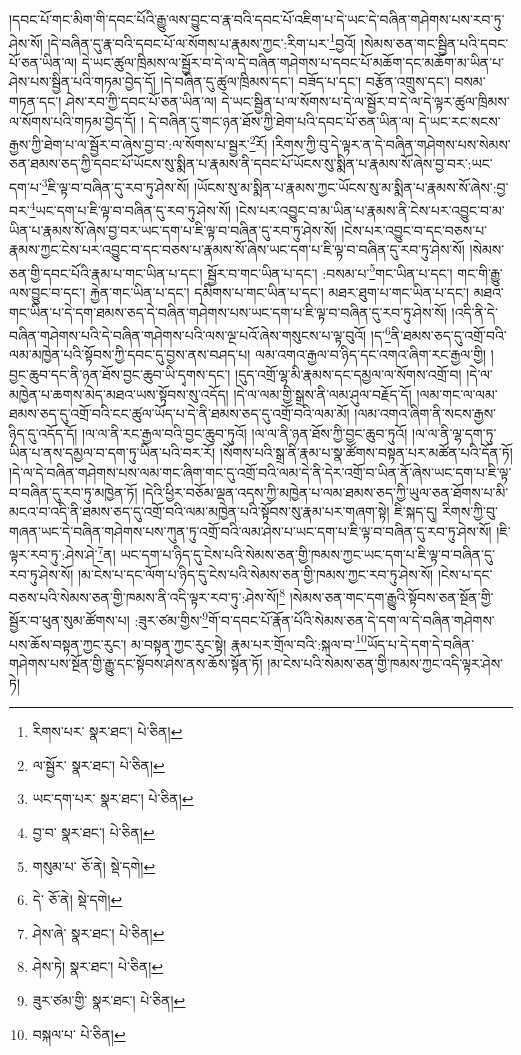 །དབང་པོ་གང་མིག་གི་དབང་པོའི་རྒྱུ་ལས་བྱུང་བ་རྣ་བའི་དབང་པོ་འཇིག་པ་དེ་ཡང་དེ་བཞིན་གཤེགས་པས་རབ་ཏུ་ཤེས་སོ། །དེ་བཞིན་དུ་རྣ་བའི་དབང་པོ་ལ་སོགས་པ་རྣམས་ཀྱང་:རིག་པར་\footnote{རིགས་པར་  སྣར་ཐང་།  པེ་ཅིན། }བྱའོ། །སེམས་ཅན་གང་སྦྱིན་པའི་དབང་པོ་ཅན་ཡིན་ལ། དེ་ཡང་ཚུལ་ཁྲིམས་ལ་སྦྱོར་བ་དེ་ལ་དེ་བཞིན་གཤེགས་པ་དབང་པོ་མཆོག་དང་མཆོག་མ་ཡིན་པ་ཤེས་པས་སྦྱིན་པའི་གཏམ་བྱེད་དོ། །དེ་བཞིན་དུ་ཚུལ་ཁྲིམས་དང་། བཟོད་པ་དང་། བརྩོན་འགྲུས་དང་། བསམ་གཏན་དང་། ཤེས་རབ་ཀྱི་དབང་པོ་ཅན་ཡིན་ལ། དེ་ཡང་སྦྱིན་པ་ལ་སོགས་པ་དེ་ལ་སྦྱོར་བ་དེ་ལ་དེ་ལྟར་ཚུལ་ཁྲིམས་ལ་སོགས་པའི་གཏམ་བྱེད་དོ། །
དེ་བཞིན་དུ་གང་ཉན་ཐོས་ཀྱི་ཐེག་པའི་དབང་པོ་ཅན་ཡིན་ལ། དེ་ཡང་རང་སངས་རྒྱས་ཀྱི་ཐེག་པ་ལ་སྦྱོར་བ་ཞེས་བྱ་བ་:ལ་སོགས་པ་སྦྱར་\footnote{ལ་སྦྱོར་  སྣར་ཐང་།  པེ་ཅིན། }རོ། །རིགས་ཀྱི་བུ་དེ་ལྟར་ན་དེ་བཞིན་གཤེགས་པས་སེམས་ཅན་ཐམས་ཅད་ཀྱི་དབང་པོ་ཡོངས་སུ་སྨིན་པ་རྣམས་ནི་དབང་པོ་ཡོངས་སུ་སྨིན་པ་རྣམས་སོ་ཞེས་བྱ་བར་:ཡང་དག་པ་\footnote{ཡང་དག་པར་  སྣར་ཐང་།  པེ་ཅིན། }ཇི་ལྟ་བ་བཞིན་དུ་རབ་ཏུ་ཤེས་སོ། །ཡོངས་སུ་མ་སྨིན་པ་རྣམས་ཀྱང་ཡོངས་སུ་མ་སྨིན་པ་རྣམས་སོ་ཞེས་:བྱ་བར་\footnote{བྱ་བ་  སྣར་ཐང་།  པེ་ཅིན། }ཡང་དག་པ་ཇི་ལྟ་བ་བཞིན་དུ་རབ་ཏུ་ཤེས་སོ། །ངེས་པར་འབྱུང་བ་མ་ཡིན་པ་རྣམས་ནི་ངེས་པར་འབྱུང་བ་མ་ཡིན་པ་རྣམས་སོ་ཞེས་བྱ་བར་ཡང་དག་པ་ཇི་ལྟ་བ་བཞིན་དུ་རབ་ཏུ་ཤེས་སོ། །ངེས་པར་འབྱུང་བ་དང་བཅས་པ་རྣམས་ཀྱང་ངེས་པར་འབྱུང་བ་དང་བཅས་པ་རྣམས་སོ་ཞེས་ཡང་དག་པ་ཇི་ལྟ་བ་བཞིན་དུ་རབ་ཏུ་ཤེས་སོ། །སེམས་ཅན་གྱི་དབང་པོའི་རྣམ་པ་གང་ཡིན་པ་དང་། སྦྱོར་བ་གང་ཡིན་པ་དང་། :བསམ་པ་\footnote{གསུམ་པ་  ཅོ་ནེ།  སྡེ་དགེ། }གང་ཡིན་པ་དང་། གང་གི་རྒྱུ་ལས་བྱུང་བ་དང་། རྐྱེན་གང་ཡིན་པ་དང་། དམིགས་པ་གང་ཡིན་པ་དང་། མཐར་ཐུག་པ་གང་ཡིན་པ་དང་། མཐའ་གང་ཡིན་པ་དེ་དག་ཐམས་ཅད་དེ་བཞིན་གཤེགས་པས་ཡང་དག་པ་ཇི་ལྟ་བ་བཞིན་དུ་རབ་ཏུ་ཤེས་སོ། །འདི་ནི་དེ་བཞིན་གཤེགས་པའི་དེ་བཞིན་གཤེགས་པའི་ལས་ལྔ་པའོ་ཞེས་གསུངས་པ་ལྟ་བུའོ། །ད་\footnote{དེ་  ཅོ་ནེ།  སྡེ་དགེ། }ནི་ཐམས་ཅད་དུ་འགྲོ་བའི་ལམ་མཁྱེན་པའི་སྟོབས་ཀྱི་དབང་དུ་བྱས་ནས་བཤད་པ། ལམ་འགའ་རྒྱལ་བ་ཉིད་དང་འགའ་ཞིག་རང་རྒྱལ་གྱི། །བྱང་ཆུབ་དང་ནི་ཉན་ཐོས་བྱང་ཆུབ་ཡི་དྭགས་དང་། །དུད་འགྲོ་ལྷ་མི་རྣམས་དང་དམྱལ་ལ་སོགས་འགྲོ་བ། །དེ་ལ་མཁྱེན་པ་ཆགས་མེད་མཐའ་ཡས་སྟོབས་སུ་འདོད། །དེ་ལ་ལམ་གྱི་སྒྲས་ནི་ལམ་ཤུལ་བརྗོད་དོ། །ལམ་གང་ལ་ལམ་ཐམས་ཅད་དུ་འགྲོ་བའི་ངང་ཚུལ་ཡོད་པ་དེ་ནི་ཐམས་ཅད་དུ་འགྲོ་བའི་ལམ་མོ། །ལམ་འགའ་ཞིག་ནི་སངས་རྒྱས་ཉིད་དུ་འདོད་དོ། །ལ་ལ་ནི་རང་རྒྱལ་བའི་བྱང་ཆུབ་ཏུའོ། །ལ་ལ་ནི་ཉན་ཐོས་ཀྱི་བྱང་ཆུབ་ཏུའོ། །ལ་ལ་ནི་ལྷ་དག་ཏུ་ཡིན་པ་ནས་དམྱལ་བ་དག་ཏུ་ཡིན་པའི་བར་རོ། །སོགས་པའི་སྒྲ་ནི་རྣམ་པ་སྣ་ཚོགས་བསྟན་པར་མཚོན་པའི་དོན་ཏོ། །དེ་ལ་དེ་བཞིན་གཤེགས་པས་ལམ་གང་ཞིག་གང་དུ་འགྲོ་བའི་ལམ་དེ་ནི་དེར་འགྲོ་བ་ཡིན་ནོ་ཞེས་ཡང་དག་པ་ཇི་ལྟ་བ་བཞིན་དུ་རབ་ཏུ་མཁྱེན་ཏོ། །དེའི་ཕྱིར་བཅོམ་ལྡན་འདས་ཀྱི་མཁྱེན་པ་ལམ་ཐམས་ཅད་ཀྱི་ཡུལ་ཅན་ཐོགས་པ་མི་མངའ་བ་འདི་ནི་ཐམས་ཅད་དུ་འགྲོ་བའི་ལམ་མཁྱེན་པའི་སྟོབས་སུ་རྣམ་པར་གཞག་སྟེ། ཇི་སྐད་དུ། རིགས་ཀྱི་བུ་གཞན་ཡང་དེ་བཞིན་གཤེགས་པས་ཀུན་ཏུ་འགྲོ་བའི་ལམ་ཤེས་པ་ཡང་དག་པ་ཇི་ལྟ་བ་བཞིན་དུ་རབ་ཏུ་ཤེས་སོ། །ཇི་ལྟར་རབ་ཏུ་:ཤེས་ཤེ་\footnote{ཤེས་ཞེ་  སྣར་ཐང་།  པེ་ཅིན། }ན། ཡང་དག་པ་ཉིད་དུ་ངེས་པའི་སེམས་ཅན་གྱི་ཁམས་ཀྱང་ཡང་དག་པ་ཇི་ལྟ་བ་བཞིན་དུ་རབ་ཏུ་ཤེས་སོ། །མ་ངེས་པ་དང་ལོག་པ་ཉིད་དུ་ངེས་པའི་སེམས་ཅན་གྱི་ཁམས་ཀྱང་རབ་ཏུ་ཤེས་སོ། །ངེས་པ་དང་བཅས་པའི་སེམས་ཅན་གྱི་ཁམས་ནི་འདི་ལྟར་རབ་ཏུ་:ཤེས་སོ།\footnote{ཤེས་ཏེ།  སྣར་ཐང་།  པེ་ཅིན། } །སེམས་ཅན་གང་དག་རྒྱུའི་སྟོབས་ཅན་སྔོན་གྱི་སྦྱོར་བ་ཕུན་སུམ་ཚོགས་པ། :ཟུར་ཙམ་གྱིས་\footnote{ཟུར་ཙམ་གྱི་  སྣར་ཐང་།  པེ་ཅིན། }གོ་བ་དབང་པོ་རྣོན་པོའི་སེམས་ཅན་དེ་དག་ལ་དེ་བཞིན་གཤེགས་པས་ཆོས་བསྟན་ཀྱང་རུང་། མ་བསྟན་ཀྱང་རུང་སྟེ། རྣམ་པར་གྲོལ་བའི་:སྐལ་བ་\footnote{བསྐལ་པ་  པེ་ཅིན། }ཡོད་པ་དེ་དག་དེ་བཞིན་གཤེགས་པས་སྔོན་གྱི་རྒྱུ་དང་སྟོབས་ཤེས་ནས་ཆོས་སྟོན་ཏོ། །མ་ངེས་པའི་སེམས་ཅན་གྱི་ཁམས་ཀྱང་འདི་ལྟར་ཤེས་ཏེ། 